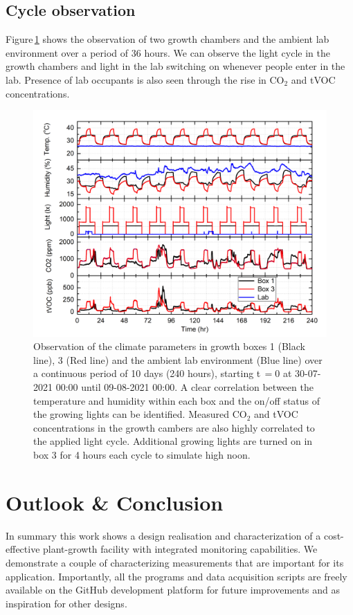 \documentclass[reprint,superscriptaddress,aps,amsmath,amssymb]{revtex4-1}
\begin{document}
\subsection{Cycle observation}
Figure\,\ref{fig:long observation} shows the observation of two growth chambers and the ambient lab environment over a period of 36 hours. We can observe the light cycle in the growth chambers and light in the lab switching on whenever people enter in the lab. Presence of lab occupants is also seen through the rise in CO$_2$ and tVOC concentrations.
\begin{figure}
    \centering
    \includegraphics[width = 1.2\textwidth, angle = -90]{10d measurement.jpg}
    \caption{Observation of the climate parameters in growth boxes 1 (Black line), 3 (Red line) and the ambient lab environment (Blue line) over a continuous period of 10 days (240 hours), starting t\,$=0$ at 30-07-2021 00:00 until 09-08-2021 00:00. A clear correlation between the temperature and humidity within each box and the on/off status of the growing lights can be identified. Measured CO$_2$ and tVOC concentrations in the growth cambers are also highly correlated to the applied light cycle. Additional growing lights are turned on in box 3 for 4 hours each cycle to simulate high noon.}
    \label{fig:long observation}
\end{figure}
\newpage

\section{Outlook \& Conclusion}
In summary this work shows a design realisation and characterization of a cost-effective plant-growth facility with integrated monitoring capabilities. We demonstrate a couple of characterizing measurements that are important for its application. Importantly, all the programs and data acquisition scripts are freely available on the GitHub development platform for future improvements and as inspiration for other designs.
\end{document}
